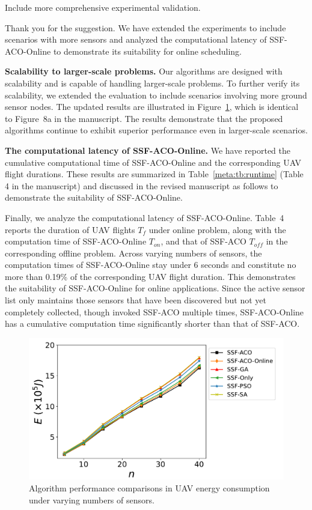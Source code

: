 \begin{metacomment}
	Include more comprehensive experimental validation.
\end{metacomment}
\begin{metaresponse}
	Thank you for the suggestion.
	We have extended the experiments to include scenarios with more sensors and analyzed the computational latency of SSF-ACO-Online to demonstrate its suitability for online scheduling.

	\textbf{Scalability to larger-scale problems.}
	Our algorithms are designed with scalability and is capable of handling larger-scale problems.
	To further verify its scalability, we extended the evaluation to include scenarios involving more ground sensor nodes. The updated results are illustrated in Figure~\ref{meta:fig:40nodes}, which is identical to Figure~8a in the manuscript. The results demonstrate that the proposed algorithms continue to exhibit superior performance even in larger-scale scenarios.

	\textbf{The computational latency of SSF-ACO-Online.}
	We have reported the cumulative computational time of SSF-ACO-Online and the corresponding UAV flight durations.
	These results are summarized in Table~\ref{meta:tb:runtime} (Table 4 in the manuscript) and discussed in the revised manuscript as follows to demonstrate the suitability of SSF-ACO-Online.

	\begin{changes}
		Finally, we analyze the computational latency of SSF-ACO-Online.
		Table~4 reports the duration of UAV flights $T_f$ under online problem, along with the computation time of SSF-ACO-Online $T_{on}$, and that of SSF-ACO $T_{off}$ in the corresponding offline problem.
		Across varying numbers of sensors, the computation times of SSF-ACO-Online stay under 6 seconds and constitute no more than 0.19\% of the corresponding UAV flight duration.
		This demonstrates the suitability of SSF-ACO-Online for online applications.
		Since the active sensor list only maintains those sensors that have been discovered but not yet completely collected, though invoked SSF-ACO multiple times, SSF-ACO-Online has a cumulative computation time significantly shorter than that of SSF-ACO.
	\end{changes}

	\begin{figure}[h]
		\centerline{\includegraphics[width=.65\textwidth]{fig/exp_number_40_legend.pdf}}
		\caption{Algorithm performance comparisons in UAV energy consumption under varying numbers of sensors.}
		\label{meta:fig:40nodes}
	\end{figure}


\end{metaresponse}
